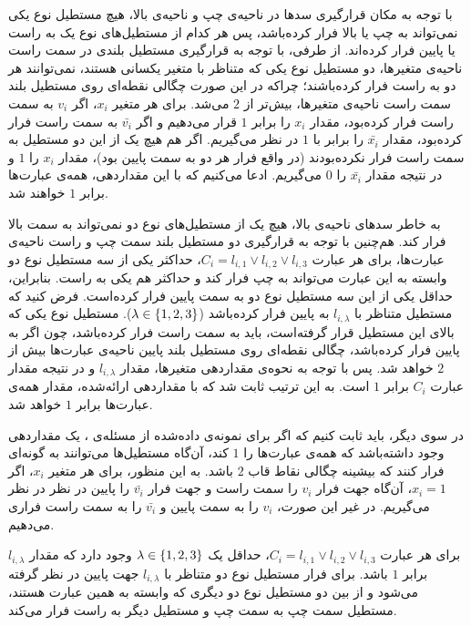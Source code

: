 با توجه به مکان قرارگیری سد‌ها در ناحیه‌ی چپ و ناحیه‌ی بالا، هیچ مستطیل نوع یکی نمی‌تواند به چپ یا بالا فرار کرده‌باشد، پس هر کدام از مستطیل‌های نوع یک به راست یا پایین فرار کرده‌اند. از طرفی، با توجه به قرار‌گیری مستطیل بلندی در سمت راست ناحیه‌ی متغیر‌ها، دو مستطیل نوع یکی که متناظر با متغیر یکسانی هستند، نمی‌توانند هر دو به راست فرار کرده‌باشند؛ چراکه در این صورت چگالی نقطه‌ای روی مستطیل بلند سمت راست ناحیه‌ی متغیر‌ها، بیش‌تر از $2$ می‌شد. برای هر متغیر $x_{i}$، اگر $v_{i}$ به سمت راست فرار کرده‌بود، مقدار $x_{i}$ را برابر $1$ قرار می‌دهیم و اگر $\bar{v_{i}}$ به سمت راست فرار کرده‌بود، مقدار $\bar{x_{i}}$ را برابر با $1$ در نظر می‌گیریم. اگر هم هیچ یک از این دو مستطیل به سمت راست فرار نکرده‌بودند (در واقع فرار هر دو به سمت پایین بود)، مقدار $x_{i}$ را $1$ و در نتیجه مقدار $\bar{x_{i}}$ را $0$ می‌گیریم. ادعا می‌کنیم که با این مقداردهی، همه‌ی عبارت‌ها برابر $1$ خواهند شد.

به خاطر سد‌های ناحیه‌ی بالا، هیچ یک از مستطیل‌های نوع دو نمی‌تواند به سمت بالا فرار کند. هم‌چنین با توجه به قرارگیری دو مستطیل بلند سمت چپ و راست ناحیه‌ی عبارت‌ها، برای هر عبارت $C_i = l_{i, 1} \vee l_{i, 2} \vee l_{i, 3}$، حداکثر یکی از سه مستطیل نوع دو وابسته به این عبارت می‌تواند به چپ فرار کند و حد‌اکثر هم یکی به راست. بنابراین، حد‌اقل یکی از این سه مستطیل نوع دو به سمت پایین فرار کرده‌است. فرض کنید که مستطیل متناظر با $l_{i, \lambda}$ به پایین فرار کرده‌باشد ($\lambda \in {\{ 1, 2, 3 \}}$). مستطیل نوع یکی که بالای این مستطیل قرار گرفته‌است، باید به سمت راست فرار کرده‌باشد، چون اگر به پایین فرار کرده‌باشد، چگالی نقطه‌ای روی مستطیل بلند پایین ناحیه‌ی عبارت‌ها بیش از $2$ خواهد شد. پس با توجه به نحوه‌ی مقداردهی متغیر‌ها، مقدار $l_{i, \lambda}$ و در نتیجه مقدار عبارت $C_i$ برابر $1$ است. به این ترتیب ثابت شد که با مقداردهی ارائه‌شده، مقدار همه‌ی عبارت‌‌ها برابر $1$ خواهد شد.

در سوی دیگر، باید ثابت کنیم که اگر برای نمونه‌ی داده‌شده از مسئله‌ی ، یک مقداردهی وجود داشته‌باشد که همه‌ی عبارت‌ها را $1$ کند، آن‌گاه مستطیل‌ها می‌توانند به گونه‌ای فرار کنند که بیشینه چگالی نقاط قاب $2$ باشد. به این منظور، برای هر متغیر $x_{i}$، اگر $x_{i} = 1$، آن‌گاه جهت فرار $v_{i}$ را سمت راست و جهت فرار $\bar{v_{i}}$ را پایین در نظر در نظر می‌گیریم. در غیر این صورت، $v_{i}$ را به سمت پایین و $\bar{v_{i}}$ را به سمت راست فراری می‌دهیم.

برای هر عبارت $C_i = l_{i, 1} \vee l_{i, 2} \vee l_{i, 3}$، حد‌اقل یک $\lambda \in {\{ 1, 2, 3 \}}$ وجود دارد که مقدار $l_{i, \lambda}$ برابر $1$ باشد. برای فرار مستطیل نوع دو متناظر با $l_{i, \lambda}$ جهت پایین در نظر گرفته می‌شود و از بین دو مستطیل نوع دو دیگری که وابسته به همین عبارت هستند، مستطیل سمت چپ به سمت چپ و مستطیل دیگر به راست فرار می‌کند.

